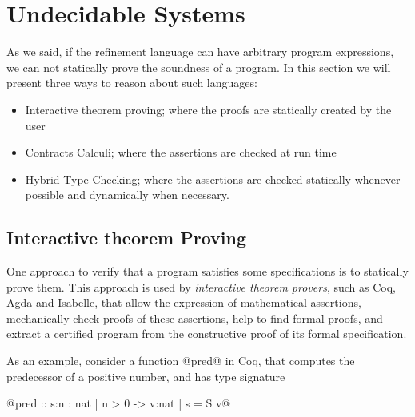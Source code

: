 \newcommand\trefc[4]{\ensuremath{\langle\{#1 : #2  \mid #3 \}\rangle^{#4}}}

\newcommand\tlabel{T-Label}
\newcommand\tcast{T-Cast}

\newcommand\cbase{C-Base}
\newcommand\cfunction{C-Fun}


\newcommand\elabel[1]{\ensuremath{\Uparrow \ #1}}
\newcommand\ecast[3]{\ensuremath{\langle #1 \Rightarrow #2 \rangle^{#3}}}

\newcommand\isCompatible[2]{\ensuremath{ #1 \Vert #2 }}

\section{Undecidable Systems}\label{sec:undec}

As we said, if the refinement language can have arbitrary program expressions,
we can not statically prove the soundness of a program. 
%
In this section we will present three ways to reason about such languages:
\begin{itemize}
\item Interactive theorem proving; where the proofs are statically created by the user
\item Contracts Calculi; where the assertions are checked at run time
\item Hybrid Type Checking; where the assertions are checked statically whenever possible
and dynamically when necessary.
\end{itemize}



\subsection{Interactive theorem Proving}


One approach to verify that a program satisfies some 
specifications is to statically prove them.
% 
This approach is used by \textit{interactive theorem provers}, 
such as Coq, Agda and Isabelle,
that allow the 
expression of mathematical assertions, 
mechanically check proofs of these assertions, 
help to find formal proofs, 
and extract a certified program from 
the constructive proof of its formal specification.


As an example, consider a function @pred@ in Coq, 
that computes the predecessor of a positive number,
and has type signature

@pred :: s:{n : nat | n > 0}  -> {v:nat | s = S v}@

